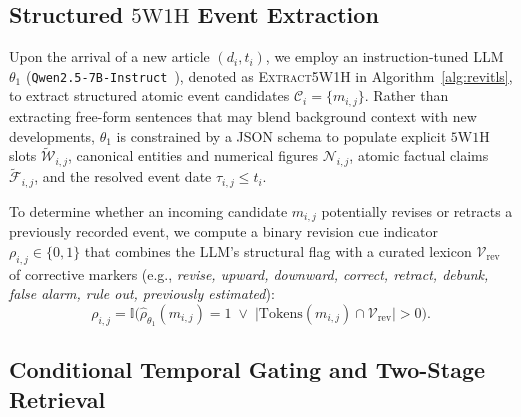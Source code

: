 \documentclass[journal]{IEEEtran}
\begin{document}
\subsection{Structured $5\text{W}1\text{H}$ Event Extraction}
\label{subsec:extraction}

Upon the arrival of a new article $(d_i, t_i)$, we employ an instruction-tuned LLM $\theta_1$ (\texttt{Qwen2.5-7B-Instruct}~\cite{qwen25}), denoted as \textsc{Extract5W1H} in Algorithm~\ref{alg:revitls}, to extract structured atomic event candidates $\mathcal{C}_i = \{m_{i,j}\}$. Rather than extracting free-form sentences that may blend background context with new developments, $\theta_1$ is constrained by a JSON schema to populate explicit $5\text{W}1\text{H}$ slots $\tilde{\mathcal{W}}_{i,j}$, canonical entities and numerical figures $\mathcal{N}_{i,j}$, atomic factual claims $\tilde{\mathcal{F}}_{i,j}$, and the resolved event date $\tau_{i,j} \le t_i$.

To determine whether an incoming candidate $m_{i,j}$ potentially revises or retracts a previously recorded event, we compute a binary revision cue indicator $\rho_{i,j} \in \{0, 1\}$ that combines the LLM's structural flag with a curated lexicon $\mathcal{V}_{\text{rev}}$ of corrective markers (e.g., \textit{revise, upward, downward, correct, retract, debunk, false alarm, rule out, previously estimated}):
\begin{equation}
\rho_{i,j} = \mathbb{I}\Big( \hat{\rho}_{\theta_1}(m_{i,j}) = 1 \;\lor\; \big|\text{Tokens}(m_{i,j}) \cap \mathcal{V}_{\text{rev}}\big| > 0 \Big).
\label{eq:rev_cue}
\end{equation}

\subsection{Conditional Temporal Gating and Two-Stage Retrieval}
\label{subsec:retrieval}
\end{document}
